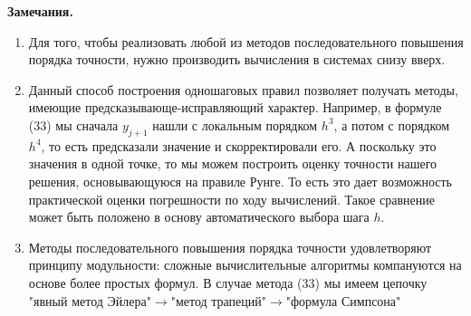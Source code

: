 \documentclass[a4paper, 12pt]{report}
\numberwithin{equation}{section}
\begin{document}
	\textbf{Замечания.}
	\begin{enumerate}
		\item Для того, чтобы реализовать любой из методов последовательного повышения порядка точности, нужно производить вычисления в системах снизу вверх.
		\item Данный способ построения одношаговых правил позволяет получать методы, имеющие предсказывающе-исправляющий характер. Например, в формуле (33) мы сначала $y_{j+1}$ нашли с локальным порядком $h^3$, а потом с порядком $h^4$, то есть предсказали значение и скорректировали его. А поскольку это значения в одной точке, то мы можем построить оценку точности нашего решения, основывающуюся на правиле Рунге. То есть это дает возможность практической оценки погрешности по ходу вычислений. Такое сравнение может быть положено в основу автоматического выбора шага $h$.
		\item Методы последовательного повышения порядка точности удовлетворяют принципу модульности: сложные вычислительные алгоритмы компануются на основе более простых формул. В случае метода (33) мы имеем цепочку "явный метод Эйлера"$\to$"метод трапеций"$\to$"формула Симпсона"
	\end{enumerate}
\end{document}
